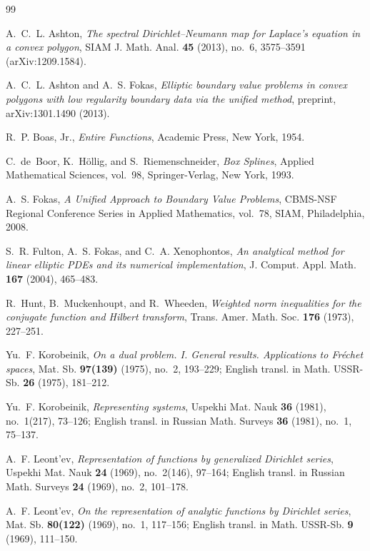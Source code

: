 \documentclass[11pt,reqno]{amsart}
\theoremstyle{definition}
\theoremstyle{remark}
\begin{document}
\begin{thebibliography}{99}

A.~C.~L. Ashton, \emph{The spectral Dirichlet--Neumann map for Laplace's equation in a convex polygon}, SIAM J. Math. Anal. \textbf{45} (2013), no.~6, 3575--3591 (arXiv:1209.1584).

A.~C.~L. Ashton and A.~S. Fokas, \emph{Elliptic boundary value problems in convex polygons with low regularity boundary data via the unified method}, preprint, arXiv:1301.1490 (2013).

R.~P. Boas, Jr., \emph{Entire Functions}, Academic Press, New York, 1954.

C.~de~Boor, K.~H\"ollig, and S.~Riemenschneider, \emph{Box Splines}, Applied Mathematical Sciences, vol.~98, Springer-Verlag, New York, 1993.

A.~S. Fokas, \emph{A Unified Approach to Boundary Value Problems}, CBMS-NSF Regional Conference Series in Applied Mathematics, vol.~78, SIAM, Philadelphia, 2008.

S.~R. Fulton, A.~S. Fokas, and C.~A. Xenophontos, \emph{An analytical method for linear elliptic PDEs and its numerical implementation}, J. Comput. Appl. Math. \textbf{167} (2004), 465--483.

R.~Hunt, B.~Muckenhoupt, and R.~Wheeden, \emph{Weighted norm inequalities for the conjugate function and Hilbert transform}, Trans. Amer. Math. Soc. \textbf{176} (1973), 227--251.

Yu.~F. Korobeinik, \emph{On a dual problem. I. General results. Applications to Fr\'echet spaces}, Mat. Sb. \textbf{97(139)} (1975), no.~2, 193--229; English transl. in Math. USSR-Sb. \textbf{26} (1975), 181--212.

Yu.~F. Korobeinik, \emph{Representing systems}, Uspekhi Mat. Nauk \textbf{36} (1981), no.~1(217), 73--126; English transl. in Russian Math. Surveys \textbf{36} (1981), no.~1, 75--137.

A.~F. Leont'ev, \emph{Representation of functions by generalized Dirichlet series}, Uspekhi Mat. Nauk \textbf{24} (1969), no.~2(146), 97--164; English transl. in Russian Math. Surveys \textbf{24} (1969), no.~2, 101--178.

A.~F. Leont'ev, \emph{On the representation of analytic functions by Dirichlet series}, Mat. Sb. \textbf{80(122)} (1969), no.~1, 117--156; English transl. in Math. USSR-Sb. \textbf{9} (1969), 111--150.


\end{thebibliography}
\end{document}
